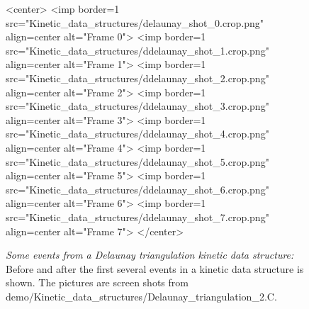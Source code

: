 \begin{figure}[htb]
\begin{ccTexOnly}
\begin{center}
\end{center}
\end{ccTexOnly}
\begin{ccHtmlOnly}
<center>
<imp border=1 src="Kinetic_data_structures/delaunay_shot_0.crop.png" align=center alt="Frame 0">
<imp border=1 src="Kinetic_data_structures/ddelaunay_shot_1.crop.png" align=center alt="Frame 1">
<imp border=1 src="Kinetic_data_structures/ddelaunay_shot_2.crop.png" align=center alt="Frame 2">
<imp border=1 src="Kinetic_data_structures/ddelaunay_shot_3.crop.png" align=center alt="Frame 3">
<imp border=1 src="Kinetic_data_structures/ddelaunay_shot_4.crop.png" align=center alt="Frame 4">
<imp border=1 src="Kinetic_data_structures/ddelaunay_shot_5.crop.png" align=center alt="Frame 5">
<imp border=1 src="Kinetic_data_structures/ddelaunay_shot_6.crop.png" align=center alt="Frame 6">
<imp border=1 src="Kinetic_data_structures/ddelaunay_shot_7.crop.png" align=center alt="Frame 7">
</center>
\end{ccHtmlOnly}
\caption{ \label{fig:delaunay_events} 
{\em Some events from a Delaunay triangulation kinetic data structure:} Before and after the first several events in a kinetic data structure is shown. The pictures are screen shots from demo/Kinetic\_data\_structures/Delaunay\_triangulation\_2.C. }
\end{figure}


\label{fig:delaunay_2_usage_program}
